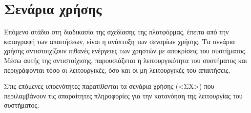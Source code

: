 \section{Σενάρια χρήσης} \label{section:3-6-use-cases}

 Επόμενο στάδιο στη διαδικασία της σχεδίασης της πλατφόρμας, έπειτα από την καταγραφή των απαιτήσεων, είναι η ανάπτυξη των σεναρίων χρήσης. Τα σενάρια χρήσης αντιστοιχίζουν πιθανές ενέργειες των χρηστών με αποκρίσεις του συστήματος. Μέσω αυτής της αντιστοίχισης, παρουσιάζεται η λειτουργικότητα του συστήματος και περιγράφονται τόσο οι λειτουργικές, όσο και οι μη λειτουργικές του απαιτήσεις.

Στις επόμενες υποενότητες παρατίθενται τα σενάρια χρήσης (<ΣΧ>) που περιλαμβάνουν τις απαραίτητες πληροφορίες για την κατανόηση της λειτουργίας του συστήματος.











